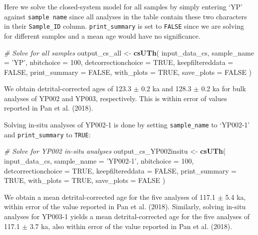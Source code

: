 \documentclass[]{elsarticle} %
\newenvironment{Shaded}{\begin{snugshade}}{\end{snugshade}}
\newcommand{\CommentTok}[1]{\textcolor[rgb]{0.56,0.35,0.01}{\textit{#1}}}
\newcommand{\DataTypeTok}[1]{\textcolor[rgb]{0.13,0.29,0.53}{#1}}
\newcommand{\DecValTok}[1]{\textcolor[rgb]{0.00,0.00,0.81}{#1}}
\newcommand{\KeywordTok}[1]{\textcolor[rgb]{0.13,0.29,0.53}{\textbf{#1}}}
\newcommand{\NormalTok}[1]{#1}
\newcommand{\OtherTok}[1]{\textcolor[rgb]{0.56,0.35,0.01}{#1}}
\newcommand{\StringTok}[1]{\textcolor[rgb]{0.31,0.60,0.02}{#1}}
\begin{document}
Here we solve the closed-system model for all samples by simply entering `YP' against \texttt{sample\ name} since all analyses in the table contain these two characters in their \texttt{Sample\_ID} column. \texttt{print\_summary} is set to \texttt{FALSE} since we are solving for different samples and a mean age would have no significance.

\begin{Shaded}
\begin{Highlighting}[]
\CommentTok{# Solve for all samples}
\NormalTok{output_cs_all <-}
\StringTok{  }\KeywordTok{csUTh}\NormalTok{(}
\NormalTok{    input_data_cs,}
    \DataTypeTok{sample_name =} \StringTok{'YP'}\NormalTok{,}
    \DataTypeTok{nbitchoice =} \DecValTok{100}\NormalTok{,}
    \DataTypeTok{detcorrectionchoice =} \OtherTok{TRUE}\NormalTok{,}
    \DataTypeTok{keepfiltereddata =} \OtherTok{FALSE}\NormalTok{,}
    \DataTypeTok{print_summary =} \OtherTok{FALSE}\NormalTok{,}
    \DataTypeTok{with_plots =} \OtherTok{TRUE}\NormalTok{,}
    \DataTypeTok{save_plots =} \OtherTok{FALSE}
\NormalTok{  )}
\end{Highlighting}
\end{Shaded}

We obtain detrital-corrected ages of 123.3 \(\pm\) 0.2 ka and 128.3 \(\pm\) 0.2 ka for bulk analyses of YP002 and YP003, respectively. This is within error of values reported in Pan et al. (2018).

Solving in-situ analyses of YP002-1 is done by setting \texttt{sample\_name} to `YP002-1' and \texttt{print\_summary} to \texttt{TRUE}:

\begin{Shaded}
\begin{Highlighting}[]
\CommentTok{# Solve for YP002 in-situ analyses}
\NormalTok{output_cs_YP002insitu <-}
\StringTok{  }\KeywordTok{csUTh}\NormalTok{(}
\NormalTok{    input_data_cs,}
    \DataTypeTok{sample_name =} \StringTok{'YP002-1'}\NormalTok{,}
    \DataTypeTok{nbitchoice =} \DecValTok{100}\NormalTok{,}
    \DataTypeTok{detcorrectionchoice =} \OtherTok{TRUE}\NormalTok{,}
    \DataTypeTok{keepfiltereddata =} \OtherTok{FALSE}\NormalTok{,}
    \DataTypeTok{print_summary =} \OtherTok{TRUE}\NormalTok{,}
    \DataTypeTok{with_plots =} \OtherTok{TRUE}\NormalTok{,}
    \DataTypeTok{save_plots =} \OtherTok{FALSE}
\NormalTok{  )}
\end{Highlighting}
\end{Shaded}

We obtain a mean detrital-corrected age for the five analyses of 117.1 \(\pm\) 5.4 ka, within error of the value reported in Pan et al. (2018).
Similarly, solving in-situ analyses for YP003-1 yields a mean detrital-corrected age for the five analyses of 117.1 \(\pm\) 3.7 ka, also within error of the value reported in Pan et al. (2018).
\end{document}
